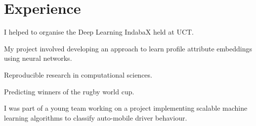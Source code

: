 \documentclass[]{deedy-resume-openfont}
\begin{document}
\begin{minipage}[t]{0.66\textwidth} 


\section{Experience}

\vspace{\topsep}
\begin{tightemize}
\item I helped to organise the Deep Learning IndabaX held at UCT. \href{https://indabax.github.io/}{\custombold{[link]}}
\end{tightemize}
\sectionsep

\begin{tightemize}
\item My project involved developing an approach to learn profile attribute embeddings using neural networks. \href{http://praelexis.com/attribute-embedding-using-neural-networks/}{\custombold{[link]}}
\end{tightemize}
\sectionsep

\begin{tightemize}
	\item Reproducible research in computational sciences. \href{https://blog.dominodatalab.com/reproducible-research-using-domino/}{\custombold{[link]}} 
    \item Predicting winners of the rugby world cup. \href{https://blog.dominodatalab.com/predicting-winners-of-the-rugby-world-cup/}{\custombold{[link]}}
\end{tightemize}
\sectionsep

\begin{tightemize}
\item I was part of a young team working on a project implementing scalable machine learning algorithms to classify auto-mobile driver behaviour. 
\end{tightemize}
\sectionsep


\end{minipage}
\end{document}
